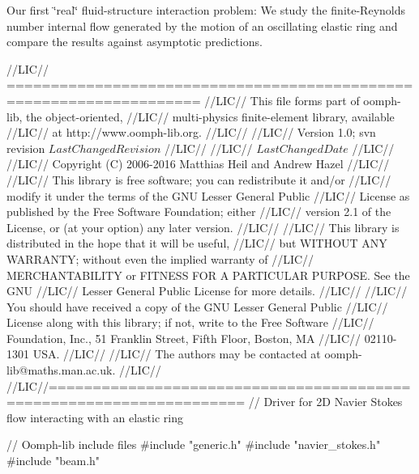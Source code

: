 Our first \char`\"{}real\char`\"{} fluid-\/structure interaction problem\+: We study the finite-\/\+Reynolds number internal flow generated by the motion of an oscillating elastic ring and compare the results against asymptotic predictions.


\begin{DoxyCodeInclude}
\textcolor{comment}{//LIC// ====================================================================}
\textcolor{comment}{//LIC// This file forms part of oomph-lib, the object-oriented, }
\textcolor{comment}{//LIC// multi-physics finite-element library, available }
\textcolor{comment}{//LIC// at http://www.oomph-lib.org.}
\textcolor{comment}{//LIC// }
\textcolor{comment}{//LIC//    Version 1.0; svn revision $LastChangedRevision$}
\textcolor{comment}{//LIC//}
\textcolor{comment}{//LIC// $LastChangedDate$}
\textcolor{comment}{//LIC// }
\textcolor{comment}{//LIC// Copyright (C) 2006-2016 Matthias Heil and Andrew Hazel}
\textcolor{comment}{//LIC// }
\textcolor{comment}{//LIC// This library is free software; you can redistribute it and/or}
\textcolor{comment}{//LIC// modify it under the terms of the GNU Lesser General Public}
\textcolor{comment}{//LIC// License as published by the Free Software Foundation; either}
\textcolor{comment}{//LIC// version 2.1 of the License, or (at your option) any later version.}
\textcolor{comment}{//LIC// }
\textcolor{comment}{//LIC// This library is distributed in the hope that it will be useful,}
\textcolor{comment}{//LIC// but WITHOUT ANY WARRANTY; without even the implied warranty of}
\textcolor{comment}{//LIC// MERCHANTABILITY or FITNESS FOR A PARTICULAR PURPOSE.  See the GNU}
\textcolor{comment}{//LIC// Lesser General Public License for more details.}
\textcolor{comment}{//LIC// }
\textcolor{comment}{//LIC// You should have received a copy of the GNU Lesser General Public}
\textcolor{comment}{//LIC// License along with this library; if not, write to the Free Software}
\textcolor{comment}{//LIC// Foundation, Inc., 51 Franklin Street, Fifth Floor, Boston, MA}
\textcolor{comment}{//LIC// 02110-1301  USA.}
\textcolor{comment}{//LIC// }
\textcolor{comment}{//LIC// The authors may be contacted at oomph-lib@maths.man.ac.uk.}
\textcolor{comment}{//LIC// }
\textcolor{comment}{//LIC//====================================================================}
\textcolor{comment}{// Driver for 2D Navier Stokes flow interacting with an elastic ring}

\textcolor{comment}{// Oomph-lib include files}
\textcolor{preprocessor}{#include "generic.h"}
\textcolor{preprocessor}{#include "navier\_stokes.h"}
\textcolor{preprocessor}{#include "beam.h"}


\end{DoxyCodeInclude}

